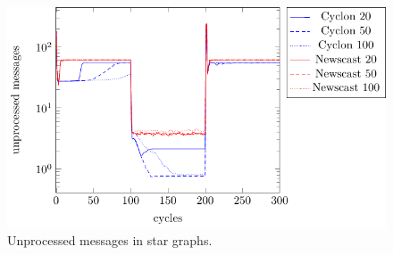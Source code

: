 \documentclass[a4paper]{ifacconf}
\begin{document}
\begin{figure}[p]
    \centering
    \includegraphics[width=.9\linewidth]{"figures/unprocessed_messages/unprocessed messages star"}
    \caption{Unprocessed messages in star graphs.}
    \label{fig:unprocessed-messages-star}
\end{figure}
\end{document}
